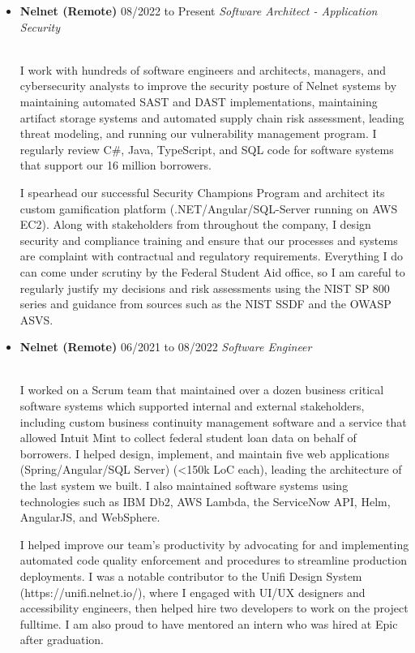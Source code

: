 \documentclass[11pt]{article}
\newcommand{\job}[3]{\vspace{1.5mm}
  \textbf{#1} \hfill #2 \linebreak \textit{#3}
}
\begin{document}
\begin{itemize}[leftmargin=*]
	\item[]
	      \job
	      {Nelnet (Remote)}
	      {08/2022 to Present}
	      {Software Architect - Application Security}
               {\\I work with hundreds of software engineers and architects, managers, and cybersecurity analysts to improve the security posture of Nelnet systems by maintaining automated SAST and DAST implementations, maintaining artifact storage systems and automated supply chain risk assessment, leading threat modeling, and running our vulnerability management program. I regularly review C\#, Java, TypeScript, and SQL code for software systems that support our 16 million borrowers.\par
I spearhead our successful Security Champions Program and architect its custom gamification platform (.NET/Angular/SQL-Server running on AWS EC2). Along with stakeholders from throughout the company, I design security and compliance training and ensure that our processes and systems are complaint with contractual and regulatory requirements. Everything I do can come under scrutiny by the Federal Student Aid office, so I am careful to regularly justify my decisions and risk assessments using the NIST SP 800 series and guidance from sources such as the NIST SSDF and the OWASP ASVS.}
	\item[]
	      \job
	      {Nelnet (Remote)}
	      {06/2021 to 08/2022}
	      {Software Engineer}
	      {\\I worked on a Scrum team that maintained over a dozen business critical software systems which supported internal and external stakeholders, including custom business continuity management software and a service that allowed Intuit Mint to collect federal student loan data on behalf of borrowers. I helped design, implement, and maintain five web applications (Spring/Angular/SQL Server) (<150k LoC each), leading the architecture of the last system we built. I also maintained software systems using technologies such as IBM Db2, AWS Lambda, the ServiceNow API, Helm, AngularJS, and WebSphere.\par
I helped improve our team's productivity by advocating for and implementing automated code quality
enforcement and procedures to streamline production deployments. I was a notable contributor to the Unifi Design System (https://unifi.nelnet.io/), where I engaged with UI/UX designers and accessibility engineers, then helped hire two developers to work on the project fulltime. I am also proud to have mentored an intern who was hired at Epic after graduation.}

\end{itemize}
\end{document}
